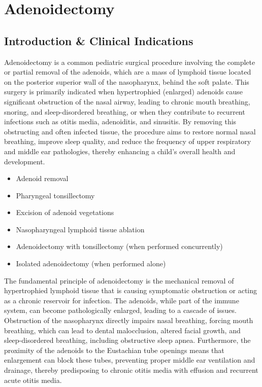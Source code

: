 \chapter{Adenoidectomy}

\section*{Introduction \& Clinical Indications}
Adenoidectomy is a common pediatric surgical procedure involving the complete or partial removal of the adenoids, which are a mass of lymphoid tissue located on the posterior superior wall of the nasopharynx, behind the soft palate. This surgery is primarily indicated when hypertrophied (enlarged) adenoids cause significant obstruction of the nasal airway, leading to chronic mouth breathing, snoring, and sleep-disordered breathing, or when they contribute to recurrent infections such as otitis media, adenoiditis, and sinusitis. By removing this obstructing and often infected tissue, the procedure aims to restore normal nasal breathing, improve sleep quality, and reduce the frequency of upper respiratory and middle ear pathologies, thereby enhancing a child's overall health and development.

\begin{itemize}
  \item Adenoid removal
  \item Pharyngeal tonsillectomy
  \item Excision of adenoid vegetations
  \item Nasopharyngeal lymphoid tissue ablation
  \item Adenoidectomy with tonsillectomy (when performed concurrently)
  \item Isolated adenoidectomy (when performed alone)
\end{itemize}

The fundamental principle of adenoidectomy is the mechanical removal of hypertrophied lymphoid tissue that is causing symptomatic obstruction or acting as a chronic reservoir for infection. The adenoids, while part of the immune system, can become pathologically enlarged, leading to a cascade of issues. Obstruction of the nasopharynx directly impairs nasal breathing, forcing mouth breathing, which can lead to dental malocclusion, altered facial growth, and sleep-disordered breathing, including obstructive sleep apnea. Furthermore, the proximity of the adenoids to the Eustachian tube openings means that enlargement can block these tubes, preventing proper middle ear ventilation and drainage, thereby predisposing to chronic otitis media with effusion and recurrent acute otitis media.

